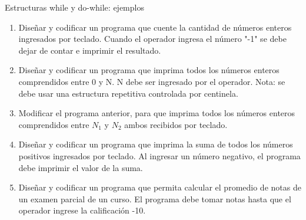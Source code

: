 \documentclass[xcolor=pdftex,table,11pt]{beamer}
\begin{document}
\begin{frame}[allowframebreaks]{Estructuras while y do-while: ejemplos}
 \begin{enumerate}
   
     \item Diseñar y codificar un programa que cuente la cantidad de números enteros ingresados por teclado. Cuando el operador ingresa el número "-1" se debe dejar de contar e imprimir el resultado.\\
\href{https://github.com/danis963/informaticaI_IUA/blob/main/c/src/4-0-while.c}{}


  \item Diseñar y codificar un programa que imprima todos los números enteros comprendidos entre 0 y N. N debe ser ingresado por el operador. 
Nota: se debe usar una estructura repetitiva controlada por centinela.
\href{https://github.com/danis963/informaticaI_IUA/blob/main/c/src/4-2-while.c}{}


  \item Modificar el programa anterior, para que imprima todos los números enteros comprendidos entre $N_1$ y $N_2$ ambos recibidos por teclado.
\href{https://github.com/danis963/informaticaI_IUA/blob/main/c/src/4-3-while.c}{}


  \item Diseñar y codificar un programa que imprima la suma de todos los números positivos ingresados por teclado. Al ingresar un número negativo, el programa debe imprimir el valor de la suma.
\href{https://github.com/danis963/informaticaI_IUA/blob/main/c/src/5-0-do_while.c}{}

  \item Diseñar y codificar un programa que permita calcular el promedio de notas de un examen parcial de un curso. El programa debe tomar notas hasta que el operador ingrese la calificación -10.
  
\href{https://github.com/danis963/informaticaI_IUA/blob/main/c/src/4-5-do_while.c}{}
   \end{enumerate}
   
\end{frame}
\end{document}
